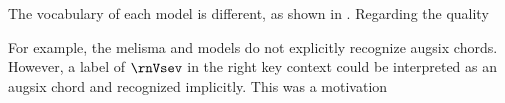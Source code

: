
The vocabulary of each model is different, as shown in
. Regarding the quality



For example, the \gls{melisma} and
\textcite{mcleod2021modular} models do not explicitly
recognize \gls{augsix} chords. However, a label of $\rnVsev$
in the right key context could be interpreted as an
\gls{augsix} chord and recognized implicitly. This was a
motivation
